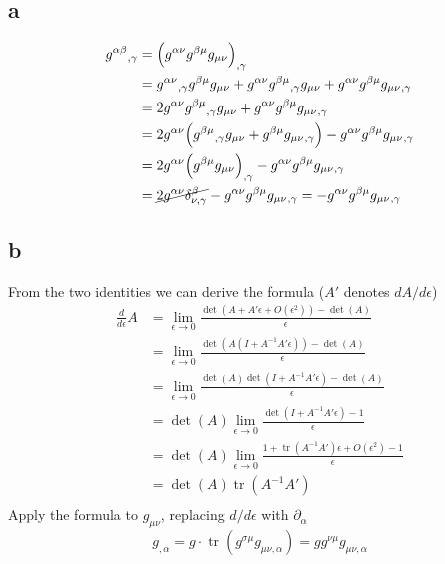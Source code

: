 \documentclass{article}
\DeclareMathOperator{\tr}{tr}
\begin{document}
\subsection*{a}
\begin{align*}
g^{\alpha\beta}{}_{,\gamma} &=\Big( g^{\alpha\nu}g^{\beta\mu}g_{\mu\nu}\Big)_{,\gamma} \\
&= g^{\alpha\nu}{}_{,\gamma}g^{\beta\mu}g_{\mu\nu} + g^{\alpha\nu}g^{\beta\mu}{}_{,\gamma}g_{\mu\nu} + g^{\alpha\nu}g^{\beta\mu}g_{\mu\nu}{}_{,\gamma} \\
&= 2g^{\alpha\nu}g^{\beta\mu}{}_{,\gamma}g_{\mu\nu} + g^{\alpha\nu}g^{\beta\mu}g_{\mu\nu}{}_{,\gamma} \\
&= 2g^{\alpha\nu}\Big( g^{\beta\mu}{}_{,\gamma}g_{\mu\nu} + g^{\beta\mu}g_{\mu\nu}{}_{,\gamma}\Big) - g^{\alpha\nu}g^{\beta\mu}g_{\mu\nu}{}_{,\gamma} \\
&= 2g^{\alpha\nu}\Big(g^{\beta\mu}g_{\mu\nu}\Big)_{,\gamma} - g^{\alpha\nu}g^{\beta\mu}g_{\mu\nu}{}_{,\gamma} \\
&= \cancel{2g^{\alpha\nu}\delta^\beta_{\nu,\gamma}} - g^{\alpha\nu}g^{\beta\mu}g_{\mu\nu}{}_{,\gamma} 
= - g^{\alpha\nu}g^{\beta\mu}g_{\mu\nu}{}_{,\gamma} 
\end{align*}
\subsection*{b}
From the two identities we can derive the formula ($A'$ denotes $dA/d\epsilon$)
\begin{align*} \frac{d}{d\epsilon}A &=  \lim_{\epsilon \rightarrow 0} \frac{\det(A + A'\epsilon + O(\epsilon^2)) - \det(A)}{\epsilon}\\
	&= \lim_{\epsilon \rightarrow 0} \frac{\det(A(I + A^{-1}A'\epsilon)) - \det(A)}{\epsilon} \\
	&=  \lim_{\epsilon \rightarrow 0} \frac{\det(A)\det(I + A^{-1}A'\epsilon) - \det(A)}{\epsilon} \\
	&=  \det(A) \lim_{\epsilon \rightarrow 0} \frac{\det(I + A^{-1}A'\epsilon) - 1}{\epsilon} \\
	&=  \det(A) \lim_{\epsilon \rightarrow 0} \frac{1 + \tr(A^{-1}A')\epsilon + O(\epsilon^2) - 1}{\epsilon} \\
	&=  \det(A) \tr(A^{-1}A') \\
\end{align*}
Apply the formula to $g_{\mu\nu}$, replacing $d/d\epsilon$ with $\partial_\alpha$
\[ g_{,\alpha} = g \cdot \tr(g^{\sigma\mu}g_{\mu\nu,\alpha}) = g g^{\nu\mu}g_{\mu\nu,\alpha} \]
\end{document}
